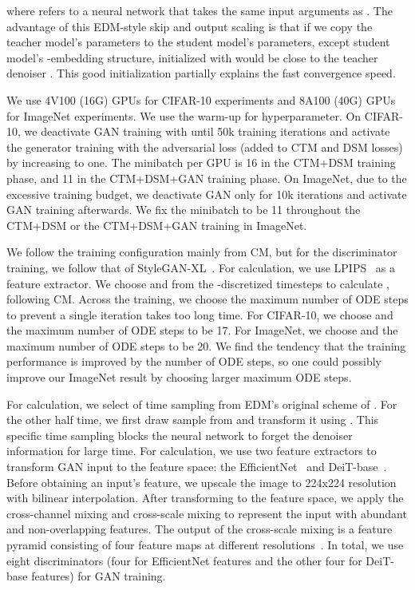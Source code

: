 \documentclass{article} \usepackage{iclr2024_coNFErence,times}
\theoremstyle{definition}
\theoremstyle{remark}
\begin{document}
where  refers to a neural network that takes the same input arguments as .
The advantage of this EDM-style skip and output scaling is that if we copy the teacher model's parameters to the student model's parameters, except student model's -embedding structure,  initialized with  would be close to the teacher denoiser . This good initialization partially explains the fast convergence speed.

We use 4V100 (16G) GPUs for CIFAR-10 experiments and 8A100 (40G) GPUs for ImageNet experiments. We use the warm-up for  hyperparameter. On CIFAR-10, we deactivate GAN training with  until 50k training iterations and activate the generator training with the adversarial loss (added to CTM and DSM losses) by increasing  to one. The minibatch per GPU is 16 in the CTM+DSM training phase, and 11 in the CTM+DSM+GAN training phase. On ImageNet, due to the excessive training budget, we deactivate GAN only for 10k iterations and activate GAN training afterwards. We fix the minibatch to be 11 throughout the CTM+DSM or the CTM+DSM+GAN training in ImageNet.

We follow the training configuration mainly from CM, but for the discriminator training, we follow that of StyleGAN-XL~\citep{sauer2022stylegan}. For  calculation, we use LPIPS~\citep{zhang2018unreasonable} as a feature extractor. We choose  and  from the -discretized timesteps to calculate , following CM. Across the training, we choose the maximum number of ODE steps to prevent a single iteration takes too long time. For CIFAR-10, we choose  and the maximum number of ODE steps to be 17. For ImageNet, we choose  and the maximum number of ODE steps to be 20. We find the tendency that the training performance is improved by the number of ODE steps, so one could possibly improve our ImageNet result by choosing larger maximum ODE steps.

For  calculation, we select  of time sampling from EDM's original scheme of . For the other half time, we first draw sample from  and transform it using . This specific time sampling blocks the neural network to forget the denoiser information for large time. For  calculation, we use two feature extractors to transform GAN input to the feature space: the EfficientNet~\citep{tan2019efficientnet} and DeiT-base~\citep{touvron2021training}. Before obtaining an input's feature, we upscale the image to 224x224 resolution with bilinear interpolation. After transforming to the feature space, we apply the cross-channel mixing and cross-scale mixing to represent the input with abundant and non-overlapping features. The output of the cross-scale mixing is a feature pyramid consisting of four feature maps at different resolutions~\citep{sauer2022stylegan}. In total, we use eight discriminators (four for EfficientNet features and the other four for DeiT-base features) for GAN training.
\end{document}
